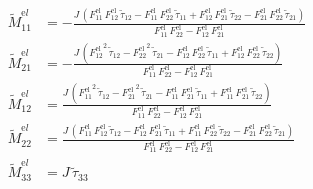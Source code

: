 \begin{align}
\tilde{M}^{\mathrm el}_{11} &= -\frac{J\,\left(F_{11}^{\mathrm{el}}\,F_{12}^{\mathrm{el}}\,\tilde{\tau }_{12}-F_{11}^{\mathrm{el}}\,F_{22}^{\mathrm{el}}\,\tilde{\tau }_{11}+F_{12}^{\mathrm{el}}\,F_{21}^{\mathrm{el}}\,\tilde{\tau }_{22}-F_{21}^{\mathrm{el}}\,F_{22}^{\mathrm{el}}\,\tilde{\tau }_{21}\right)}{F_{11}^{\mathrm{el}}\,F_{22}^{\mathrm{el}}-F_{12}^{\mathrm{el}}\,F_{21}^{\mathrm{el}}} \\ 
\tilde{M}^{\mathrm el}_{21} &= -\frac{J\,\left({F_{12}^{\mathrm{el}}}^2\,\tilde{\tau }_{12}-{F_{22}^{\mathrm{el}}}^2\,\tilde{\tau }_{21}-F_{12}^{\mathrm{el}}\,F_{22}^{\mathrm{el}}\,\tilde{\tau }_{11}+F_{12}^{\mathrm{el}}\,F_{22}^{\mathrm{el}}\,\tilde{\tau }_{22}\right)}{F_{11}^{\mathrm{el}}\,F_{22}^{\mathrm{el}}-F_{12}^{\mathrm{el}}\,F_{21}^{\mathrm{el}}} \\ 
\tilde{M}^{\mathrm el}_{12} &= \frac{J\,\left({F_{11}^{\mathrm{el}}}^2\,\tilde{\tau }_{12}-{F_{21}^{\mathrm{el}}}^2\,\tilde{\tau }_{21}-F_{11}^{\mathrm{el}}\,F_{21}^{\mathrm{el}}\,\tilde{\tau }_{11}+F_{11}^{\mathrm{el}}\,F_{21}^{\mathrm{el}}\,\tilde{\tau }_{22}\right)}{F_{11}^{\mathrm{el}}\,F_{22}^{\mathrm{el}}-F_{12}^{\mathrm{el}}\,F_{21}^{\mathrm{el}}} \\ 
\tilde{M}^{\mathrm el}_{22} &= \frac{J\,\left(F_{11}^{\mathrm{el}}\,F_{12}^{\mathrm{el}}\,\tilde{\tau }_{12}-F_{12}^{\mathrm{el}}\,F_{21}^{\mathrm{el}}\,\tilde{\tau }_{11}+F_{11}^{\mathrm{el}}\,F_{22}^{\mathrm{el}}\,\tilde{\tau }_{22}-F_{21}^{\mathrm{el}}\,F_{22}^{\mathrm{el}}\,\tilde{\tau }_{21}\right)}{F_{11}^{\mathrm{el}}\,F_{22}^{\mathrm{el}}-F_{12}^{\mathrm{el}}\,F_{21}^{\mathrm{el}}} \\ 
\tilde{M}^{\mathrm el}_{33} &= J\,\tilde{\tau }_{33} 
\end{align}
